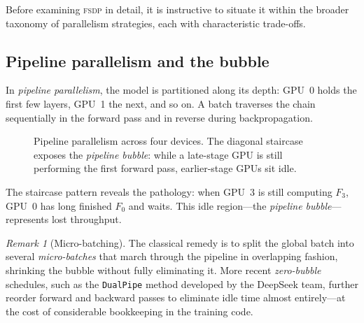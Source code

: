 \documentclass[11pt,a4paper]{article}
\theoremstyle{definition}
\theoremstyle{remark}
\newtheorem*{remark}{Remark}
\newcommand{\FSDP}{\textsc{fsdp}}
\begin{document}
Before examining \FSDP{} in detail, it is instructive to situate it within the broader taxonomy of parallelism strategies, each with characteristic trade-offs.

\subsection{Pipeline parallelism and the bubble}

In \emph{pipeline parallelism}, the model is partitioned along its depth: GPU~0 holds the first few layers, GPU~1 the next, and so on. A batch traverses the chain sequentially in the forward pass and in reverse during backpropagation.

\begin{figure}[ht]
\centering
{}
\caption{Pipeline parallelism across four devices. The diagonal staircase exposes the \emph{pipeline bubble}: while a late-stage GPU is still performing the first forward pass, earlier-stage GPUs sit idle.}
\label{fig:pipeline-bubble}
\end{figure}

The staircase pattern reveals the pathology: when GPU~3 is still computing $F_3$, GPU~0 has long finished $F_0$ and waits. This idle region---the \emph{pipeline bubble}---represents lost throughput.

\begin{remark}[Micro-batching]
The classical remedy is to split the global batch into several \emph{micro-batches} that march through the pipeline in overlapping fashion, shrinking the bubble without fully eliminating it. More recent \emph{zero-bubble} schedules, such as the \texttt{DualPipe} method developed by the DeepSeek team, further reorder forward and backward passes to eliminate idle time almost entirely---at the cost of considerable bookkeeping in the training code.
\end{remark}
\end{document}
